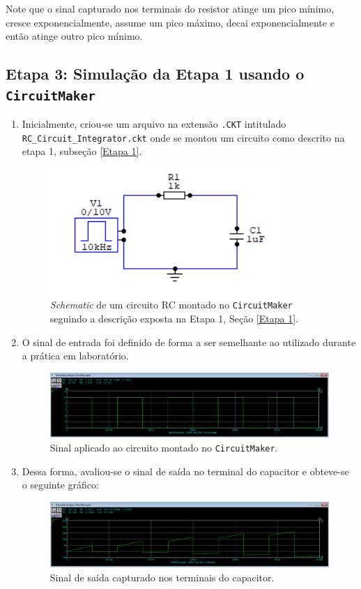\documentclass[letterpaper, 12pt]{article}
\begin{document}
\begin{enumerate}
    Note que o sinal capturado nos terminais do resistor atinge um pico mínimo, cresce exponencialmente, assume um pico máximo, decai exponencialmente e então atinge outro pico mínimo.
\end{enumerate}

\subsection{Etapa 3: Simulação da Etapa 1 usando o \texttt{CircuitMaker}}
\begin{enumerate}
    \item Inicialmente, criou-se um arquivo na extensão \texttt{.CKT} intitulado \texttt{RC\_Circuit\_Integrator.ckt} onde se montou um circuito como descrito na etapa 1, subseção \ref{Etapa 1}.
    
    \begin{figure}[h]
        \centering
        \includegraphics[width=0.5\linewidth]{figures/CircuitMaker_Integrator.png}
        \caption{{\it Schematic} de um circuito RC montado no \texttt{CircuitMaker} seguindo a descrição exposta na Etapa 1, Seção \ref{Etapa 1}.}
        \label{RC_Circuit_Integrator}
    \end{figure}
    
    \item O sinal de entrada foi definido de forma a ser semelhante ao utilizado durante a prática em laboratório.
    
    \begin{figure}[h]
        \centering
        \includegraphics[width=0.5\linewidth]{figures/CircuitMaker_Signal.png}
        \caption{Sinal aplicado ao circuito montado no \texttt{CircuitMaker}.}
        \label{RC_Circuit_Integrator}
    \end{figure}
    
    \item Dessa forma, avaliou-se o sinal de saída no terminal do capacitor e obteve-se o seguinte gráfico:
    \begin{figure}[h]
        \centering
        \includegraphics[width=0.5\linewidth]{figures/RC_Circuit_Capacitor.png}
        \caption{Sinal de saída capturado nos terminais do capacitor.}
        \label{RC_Circuit_Capacitor}
    \end{figure}
    
\end{enumerate}
\end{document}
